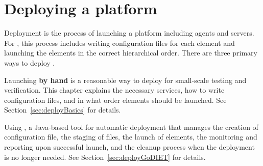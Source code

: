 
\newcommand{\bla}{}
\chapter{Deploying a \diet platform}
\label{ch:deploying}


Deployment is the process of launching a \diet platform including agents and
servers. For \diet, this process includes writing configuration files for each
element and launching the elements in the correct hierarchical order. There are
three primary ways to deploy \diet.

Launching \textbf{by hand} is a reasonable way to deploy \diet for small-scale
testing and verification. This chapter explains the necessary services, how to
write \diet configuration files, and in what order \diet elements should be
launched. See Section~\ref{sec:deployBasics} for details.

Using \textbf{\godiet}, a Java-based tool for automatic \diet deployment that
manages the creation of configuration file, the staging of files, the launch of elements,
the monitoring and reporting upon successful launch, and the cleanup process when the \diet
deployment is no longer needed. See Section~\ref{sec:deployGoDIET} for
details.

